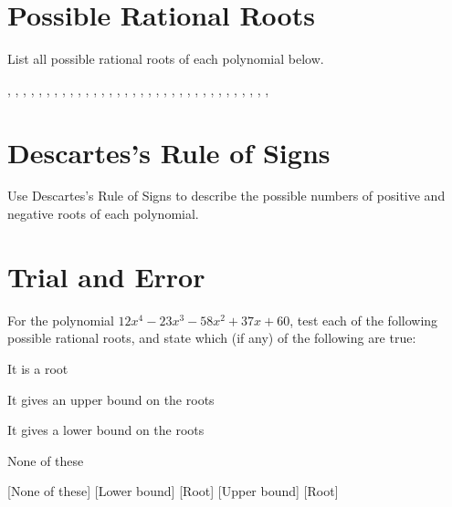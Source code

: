 \section*{Possible Rational Roots}
List all possible rational roots of each polynomial below.
\begin{smenum}
\mitemxxx
{, , , }
{, , , }
{, , , , , }
\mitemx
{,   ,   ,   , , ,   , ,
 ,           , ,                  ,
 , ,           ,       ,
 ,           , ,                  ,
 ,                     ,
 ,                    }
\end{smenum}

\section*{Descartes's Rule of Signs}
Use Descartes's Rule of Signs to describe the possible numbers of positive and negative roots of each polynomial.
\begin{smenum}
\mitemxx
{}
{}
\mitemxx
{}
{}
\end{smenum}

\section*{Trial and Error}
For the polynomial $12x^4-23x^3-58x^2+37x+60$, test each of the following possible rational roots, and state which (if any) of the following are true:
\begin{clist}
\item It is a root
\item It gives an upper bound on the roots
\item It gives a lower bound on the roots
\item None of these
\end{clist}
\begin{smenum}
\mitemxx
{[None of these]}
{[Lower bound]}
\mitemxx
{[Root]}
{[Upper bound]}
\mitemx
{[Root]}
\end{smenum}

